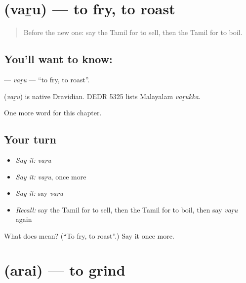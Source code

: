 \section[\texorpdfstring{\ta{வறு} (vaṟu)}{வறு (vaṟu)}]{ (vaṟu) — to fry, to roast}

\label{lesson:TA-C161-varu}



\begin{quote}
Before the new one: say the Tamil for to sell, then the Tamil for to boil.
\end{quote}

\subsection*{You'll want to know: }
\textbf{} — \emph{vaṟu} — \textquotedblleft{}to fry, to roast\textquotedblright{}.

\begin{cousinweb}
\textbf{} (\emph{vaṟu}) is native Dravidian. DEDR 5325 lists Malayalam \emph{vaṟukka}.
\end{cousinweb}

\begin{grammarlens}[title={What you've built}]
One more word for this chapter.
\end{grammarlens}

\subsection*{Your turn}
\begin{itemize}
\raggedright
  \item \emph{Say it:} \emph{vaṟu}
  \item \emph{Say it:} \emph{vaṟu}, once more
  \item \emph{Say it:} say \emph{vaṟu}
  \item \emph{Recall:} say the Tamil for to sell, then the Tamil for to boil, then say \emph{vaṟu} again
\end{itemize}

\begin{tcolorbox}[breakable,colback=teal!4,colframe=teal!35!black,title={Before you move on}]
What does  mean? (\textquotedblleft{}To fry, to roast\textquotedblright{}.) Say it once more.
\end{tcolorbox}
\section[\texorpdfstring{\ta{அரை} (arai)}{அரை (arai)}]{ (arai) — to grind}

